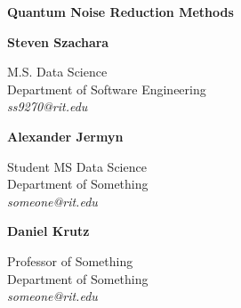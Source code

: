\documentclass[12pt, onecolumn]{IEEEtran}
\begin{document}
%

\begin{center}
{\large\bf Quantum Noise Reduction Methods}
\end{center}


\begin{center}
\begin{minipage}{0.32\linewidth}
    \begin{center}
    {\bf Steven Szachara}\\
    \begin{small}
    M.S. Data Science\\
    Department of Software Engineering\\
    {\it ss9270@rit.edu}
    \end{small}
    \end{center}
\end{minipage}
\hfill
\begin{minipage}{0.32\linewidth}
    \begin{center}
    {\bf Alexander Jermyn}\\
    \begin{small}
    Student MS Data Science\\
    Department of Something\\
    {\it someone@rit.edu}
    \end{small}
    \end{center}
\end{minipage}
\hfill
\begin{minipage}{0.32\linewidth}
    \begin{center}
    {\bf Daniel Krutz}\\
    \begin{small}
    Professor of Something\\
    Department of Something\\
    {\it someone@rit.edu}
    \end{small}
    \end{center}
\end{minipage}
\end{center}
\end{document}
